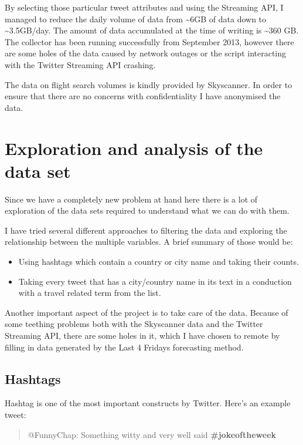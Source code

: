 \documentclass[minf,frontabs,twoside,singlespacing,parskip]{infthesis}
\begin{document}
By selecting those particular tweet attributes and using the Streaming API, I managed to reduce the daily volume of data from \textasciitilde 6GB of data down to \textasciitilde 3.5GB/day.
The amount of data accumulated at the time of writing is \textasciitilde 360 GB. The collector has been running successfully from September 2013, however there are some holes of the data caused by network outages or the script interacting with the Twitter Streaming API crashing. 

The data on flight search volumes is kindly provided by Skyscanner. In order to ensure that there are no concerns with confidentiality I have anonymised the data. 



\chapter{Exploration and analysis of the data set}

Since we have a completely new problem at hand here there is a lot of exploration of the data sets required to understand what we can do with them.

I have tried several different approaches to filtering the data and exploring the relationship between the multiple variables. A brief summary of those would be:
\begin{itemize}
\item Using hashtags which contain a country or city name and taking their counts.
\item Taking every tweet that has a city/country name in its text in a conduction with a travel related term from the list. 
\end{itemize}

Another important aspect of the project is to take care of the data. Because of some teething problems both with the Skyscanner data and the Twitter Streaming API, there are some holes in it, which I have chosen to remote by filling in data generated by the Last 4 Fridays forecasting method. 



\section{Hashtags}

Hashtag is one of the most important constructs by Twitter. Here's an example tweet:

\begin{quotation}
@FunnyChap: Something witty and very well said \bf{\#jokeoftheweek}
\end{quotation}
\end{document}
